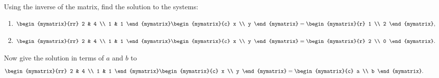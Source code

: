 \begin{enumialphparenastyle}
\begin{ex}
  Using the inverse of the matrix, find the solution to the systems:
  \begin{enumerate}
  \item
    \begin{equation*}
      \begin{mymatrix}{rr}
        2 & 4  \\
        1 & 1 
      \end{mymatrix} 
      \begin{mymatrix}{c}
        x \\
        y
      \end{mymatrix} =\begin{mymatrix}{r}
        1 \\
        2 
      \end{mymatrix},
    \end{equation*}
  \item
    \begin{equation*}
      \begin{mymatrix}{rr}
        2 & 4 \\
        1 & 1 
      \end{mymatrix} \begin{mymatrix}{c}
        x \\
        y 
      \end{mymatrix} =\begin{mymatrix}{r}
        2 \\
        0 
      \end{mymatrix}.
    \end{equation*}
  \end{enumerate}
  Now give the solution in terms of $a$ and $b$ to
  \begin{equation*}
    \begin{mymatrix}{rr}
      2 & 4 \\
      1 & 1 
    \end{mymatrix}
    \begin{mymatrix}{c}
      x \\
      y
    \end{mymatrix}
    =
    \begin{mymatrix}{c}
      a \\
      b
    \end{mymatrix}.
  \end{equation*}
\end{ex}


\end{enumialphparenastyle}
